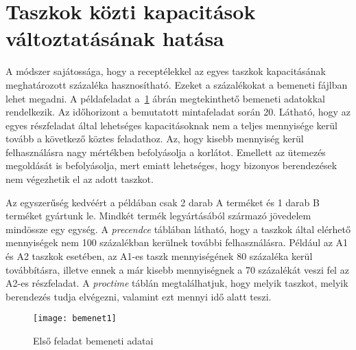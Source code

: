 \section{Taszkok közti kapacitások változtatásának hatása}
A módszer sajátossága, hogy a receptélekkel az egyes taszkok kapacitásának meghatározott százaléka hasznosítható. Ezeket a százalékokat a bemeneti fájlban lehet megadni. A példafeladat a~\ref{bemenet1} ábrán megtekinthető bemeneti adatokkal rendelkezik. Az időhorizont a bemutatott mintafeladat során 20. Látható, hogy az egyes részfeladat által lehetséges kapacitásoknak nem a teljes mennyisége kerül tovább a következő köztes feladathoz. Az, hogy kisebb mennyiség kerül felhasználásra nagy mértékben befolyásolja a korlátot. Emellett az ütemezés megoldását is befolyásolja, mert emiatt lehetséges, hogy bizonyos berendezések nem végezhetik el az adott taszkot.

Az egyszerűség kedvéért a példában csak 2 darab A terméket és 1 darab B terméket gyártunk le. Mindkét termék legyártásából származó jövedelem mindössze egy egység. A \textit{precendce} táblában látható, hogy a taszkok által elérhető mennyiségek nem 100 százalékban kerülnek további felhasználásra. Például az A1 és A2 taszkok esetében, az A1-es taszk mennyiségének 80 százaléka kerül továbbításra, illetve ennek a már kisebb mennyiségnek a 70 százalékát veszi fel az A2-es részfeladat. A \textit{proctime} táblán megtalálhatjuk, hogy melyik taszkot, melyik berendezés tudja elvégezni, valamint ezt mennyi idő alatt teszi.
 
\begin{figure}[H]
\begin{center}
\texttt{[image: bemenet1]}
\caption{Első feladat bemeneti adatai}
\label{bemenet1}
\end{center}
\end{figure}

